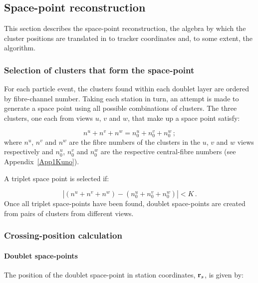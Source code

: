 \subsection{Space-point reconstruction}
\label{Sect:SpcPnt}

This section describes the space-point reconstruction, the algebra by which the cluster positions are translated in to tracker coordinates and, to some extent, the algorithm.

\subsubsection{Selection of clusters that form the space-point}

For each particle event, the clusters found within each doublet layer are ordered by fibre-channel number. Taking each station in turn, an attempt is made to generate a space point using all possible combinations of clusters. The three clusters, one each from views $u$, $v$ and $w$, that make up a space point satisfy:

\begin{equation}
 n^u + n^v + n^w = n^u_0 + n^v_0 + n^w_0 \, ;
\end{equation}
where $n^u$, $n^v$ and $n^w$ are the fibre numbers of the clusters in the $u$, $v$ and $w$ views respectively and $n^u_0$, $n^v_0$ and $n^w_0$ are the respective central-fibre numbers (see Appendix~\ref{App1Kuno}).

A triplet space point is selected if:

\begin{equation}
  | (n^u + n^v + n^w) - (n^u_0 + n^v_0 + n^w_0) | < K \, .
\end{equation}
Once all triplet space-points have been found, doublet space-points are created from pairs of clusters from different views.

\subsubsection{Crossing-position calculation}

\paragraph{Doublet space-points}
\label{Para:DblSpPnt}

The position of the doublet space-point in station coordinates, ${\bf r}_s$, is given by:

